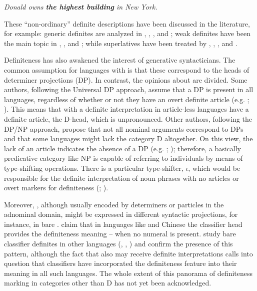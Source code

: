 \documentclass[output=paper]{langsci/langscibook}
\begin{document}
	\ex \label{ex:aguilar:1d}
	\textit{Donald owns \textbf{the highest building} in New York.} %
	
	\z  
\z \newpage

These “non-ordinary” definite descriptions have been discussed in the literature, for example: generic definites are analyzed in \citet{Chierchia1998}, \citet{Dayal2004}, \citet{Krifka2003}, \citet{Farkas2007} and \citet{Borik2012a}; weak definites have been the main topic in \citet{CarlsonSussman2005}, \citet{Aguilar-GuevaraZwarsts2011,Aguilar-GuevaraZwarts2013}, \citet{Schwarz2014} and \citet{Zwarts2014}; while superlatives have been treated by \citet{Szabolcsi1986}, \citet{Hackl2009}, \citet{SharvitStateva2002}, \citet{Krasikova2012} and \citet{CoppockBeaver2014}.

Definiteness has also awakened the interest of generative syntacticians. The common assumption for languages with  is that these correspond to the heads of determiner projections (DP). In contrast, the opinions about  are divided. Some authors, following the Universal DP approach, assume that a DP is present in all languages, regardless of whether or not they have an overt definite article (e.g. \citealt{Cinque1994}; \citealt{Longobardi1994}). This means that  with a definite interpretation in article-less languages have a definite article, the D-head, which is unpronounced. Other authors, following the DP/NP approach, propose that not all nominal arguments correspond to DPs and that some languages might lack the category D altogether. On this view, the lack of an article indicates the absence of a DP (e.g. \citealt{Baker2003}; \citealt{Boskovic2008}); therefore, a basically predicative category like NP is capable of referring to individuals by means of type-shifting operations. There is a particular type-shifter, $\iota$, which would be responsible for the definite interpretation of noun phrases with no articles or overt markers for definiteness (\citealt{Chierchia1998}; \citealt{Dayal2004}).

Moreover, , although usually encoded by determiners or particles in the adnominal domain, might be expressed in different syntactic projections, for instance, in bare . \citet{ChengSybesma1999} claim that in languages like  and  Chinese the classifier head provides the definiteness meaning -- when no numeral is present. \citet{SimpsonEtAlii2011} study bare classifier definites in other languages (, , ) and confirm the presence of this pattern, although the fact that also  may receive definite interpretations calls into question that classifiers have incorporated the definiteness feature into their meaning in all such languages. The whole extent of this panorama of definiteness marking in categories other than D has not yet been acknowledged.
\end{document}
